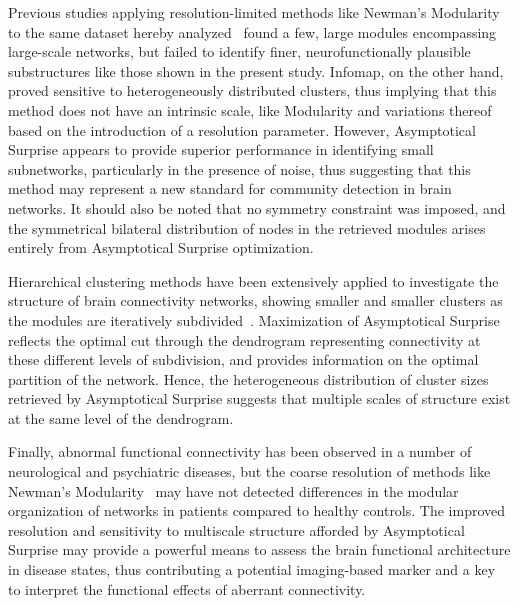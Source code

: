 Previous studies applying resolution-limited methods like Newman's Modularity to the same dataset hereby analyzed~\cite{crossley2013a} found a few, large modules encompassing large-scale networks, but failed to identify finer, neurofunctionally  plausible substructures like those shown in the present study. Infomap, on the other hand, proved sensitive to heterogeneously distributed clusters, thus implying that this method does not have an intrinsic scale, like Modularity and variations thereof based on the introduction of a resolution parameter. 
However, Asymptotical Surprise appears to provide superior performance in identifying small subnetworks, particularly in the presence of noise, thus suggesting that this method may represent a new standard for community detection in brain networks. It should also be noted that no symmetry constraint was imposed, and the symmetrical bilateral distribution of nodes in the retrieved modules arises entirely from Asymptotical Surprise optimization. 

Hierarchical clustering methods have been extensively applied to investigate the structure of brain connectivity networks, showing smaller and smaller clusters as the modules are iteratively subdivided~\cite{meunier2010}.  Maximization of Asymptotical Surprise reflects the optimal cut through the dendrogram representing connectivity at these different levels of subdivision, and provides information on the optimal partition of the network. Hence, the heterogeneous distribution of cluster sizes retrieved by Asymptotical Surprise suggests that multiple scales of structure exist at the same level of the dendrogram.

Finally, abnormal functional connectivity has been observed in a number of neurological and psychiatric diseases, but the coarse resolution of methods like Newman's Modularity~\cite{fornito2015} may have not detected differences in the modular organization of networks in patients compared to healthy controls. The improved resolution and sensitivity to multiscale structure afforded by Asymptotical Surprise may provide a powerful means to assess the brain functional architecture in disease states, thus contributing a potential imaging-based marker and a key to interpret the functional effects of aberrant connectivity.
